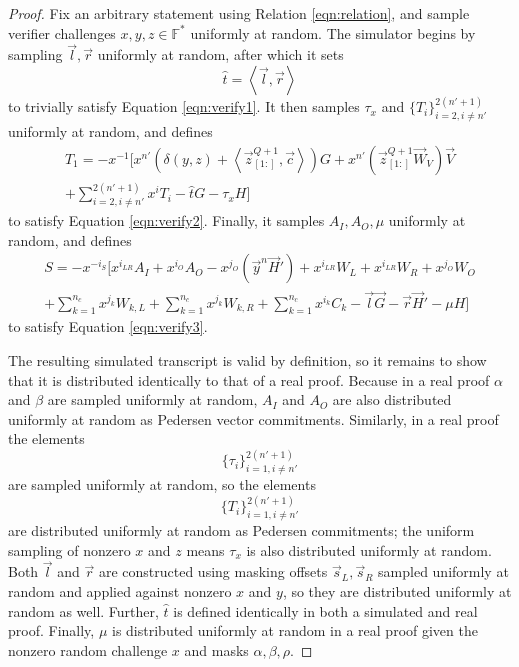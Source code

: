 \documentclass{article}
\newcommand{\FF}{\mathbb{F}}
\newcommand{\zq}{\vec{z}^{Q+1}_{[1:]}}
\begin{document}
\begin{proof}
	Fix an arbitrary statement using Relation \ref{eqn:relation}, and sample verifier challenges $x, y, z \in \FF^*$ uniformly at random.
	The simulator begins by sampling $\vec{l}, \vec{r}$ uniformly at random, after which it sets $$\widehat{t} = \left\langle \vec{l}, \vec{r} \right\rangle$$ to trivially satisfy Equation \ref{eqn:verify1}.
	It then samples $\tau_x$ and $\{ T_i \}_{i=2, i \neq n'}^{2(n' + 1)}$ uniformly at random, and defines
	\begin{multline*}
	T_1 = -x^{-1} \Biggl[ x^{n'}\left( \delta(y, z) + \left\langle \zq, \vec{c} \right\rangle \right)G + x^{n'}\left( \zq \vec{W}_V \right) \vec{V} \\
	+ \sum_{i=2, i \neq n'}^{2(n' + 1)} x^i T_i - \widehat{t} G - \tau_x H \Biggr]
	\end{multline*}
	to satisfy Equation \ref{eqn:verify2}.
	Finally, it samples $A_I, A_O, \mu$ uniformly at random, and defines
	\begin{multline*}
		S = -x^{-i_S} \Biggl[ x^{i_{LR}} A_I + x^{i_O} A_O - x^{j_O} \left( \vec{y}^n \vec{H}' \right) + x^{i_{LR}} W_L + x^{i_{LR}} W_R + x^{j_O} W_O \\
		+ \sum_{k=1}^{n_c} x^{j_k} W_{k,L} + \sum_{k=1}^{n_c} x^{j_k} W_{k,R} + \sum_{k=1}^{n_c} x^{i_k} C_k - \vec{l} \vec{G} - \vec{r} \vec{H}' - \mu H \Biggr]
	\end{multline*}
	to satisfy Equation \ref{eqn:verify3}.

	The resulting simulated transcript is valid by definition, so it remains to show that it is distributed identically to that of a real proof.
	Because in a real proof $\alpha$ and $\beta$ are sampled uniformly at random, $A_I$ and $A_O$ are also distributed uniformly at random as Pedersen vector commitments.
	Similarly, in a real proof the elements
	$$\{ \tau_i \}_{i=1, i \neq n'}^{2(n' + 1)}$$
	are sampled uniformly at random, so the elements
	$$\{ T_i \}_{i=1, i \neq n'}^{2(n' + 1)}$$
	are distributed uniformly at random as Pedersen commitments; the uniform sampling of nonzero $x$ and $z$ means $\tau_x$ is also distributed uniformly at random.
	Both $\vec{l}$ and $\vec{r}$ are constructed using masking offsets $\vec{s}_L, \vec{s}_R$ sampled uniformly at random and applied against nonzero $x$ and $y$, so they are distributed uniformly at random as well.
	Further, $\widehat{t}$ is defined identically in both a simulated and real proof.
	Finally, $\mu$ is distributed uniformly at random in a real proof given the nonzero random challenge $x$ and masks $\alpha, \beta, \rho$.


\end{proof}
\end{document}
